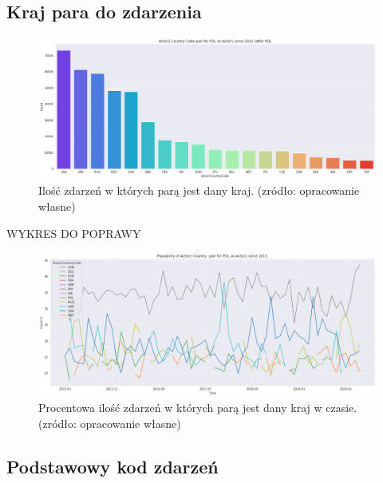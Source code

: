 \documentclass[11pt]{report}
\begin{document}
 \subsection{Kraj para do zdarzenia}
    
    \begin{figure}[ht]
	\centering
	\includegraphics[width=0.8 \textwidth]{fig/PL/PLactor2Pair.png}
	\caption{Ilość zdarzeń w których parą jest dany kraj. (zródło: opracowanie własne)}
	\label{fig:PLpair}
	\end{figure}
	
	   WYKRES DO POPRAWY
	\begin{figure}[ht]
	\centering
	\includegraphics[width=0.8 \textwidth]{fig/PL/PLactor2PairPercinTIME.png}
	\caption{Procentowa ilość zdarzeń w których parą jest dany kraj w czasie. (zródło: opracowanie własne)}
	\label{fig:PLpairPerc}
	\end{figure}
	
 \subsection{Podstawowy kod zdarzeń}
 	
\end{document}
